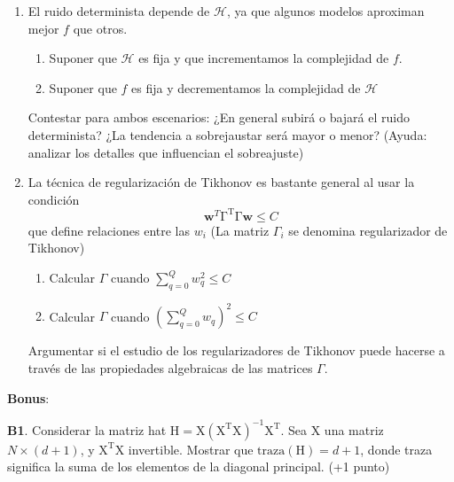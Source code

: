 \documentclass[  DIV=calc,%
paper=a4,%
fontsize=11pt]{scrartcl}             %
\begin{document}
\begin{enumerate}
    \item El ruido determinista depende de $\mathcal{H}$, ya que algunos modelos aproximan mejor $f$ que otros.
    \begin{enumerate}
      \item Suponer que $\mathcal{H}$ es fija y que incrementamos la complejidad de $f$.
      \item Suponer que $ f$ es fija y decrementamos la complejidad de $\mathcal{H}$
    \end{enumerate}
    Contestar para ambos escenarios: ¿En general subirá o bajará el ruido determinista? ¿La tendencia a sobrejaustar será mayor o menor? (Ayuda: analizar los detalles que influencian el sobreajuste)
    \item La técnica de regularización de Tikhonov es bastante general al usar la condición
    \[
    \textbf{w}^T\mathrm{\Gamma^T\Gamma}\textbf{w}\leq C
    \]
    que define relaciones entre las $w_i$ (La matriz $\Gamma_i$ se denomina regularizador de Tikhonov)
    \begin{enumerate}
      \item Calcular $\Gamma$ cuando $\sum_{q=0}^Q w_q^2 \leq C$
      \item Calcular $\Gamma$ cuando $(\sum_{q=0}^Q w_q)^2 \leq C$
    \end{enumerate}
    Argumentar si el estudio de los regularizadores de Tikhonov puede hacerse a través de las propiedades algebraicas de las matrices $\Gamma$.
  \end{enumerate}

  \textbf{Bonus}:

  \textbf{B1}. Considerar la matriz hat $\mathrm{H}=\mathrm{X(X^TX)^{-1}X^T}$. Sea $\mathrm{X}$ una matriz  $N\times (d+1)$, y $\mathrm{X^TX}$ invertible. Mostrar que $\mathrm{traza(H)}=d+1$, donde traza significa la suma de los elementos de la diagonal principal. (+1 punto)
\end{document}
